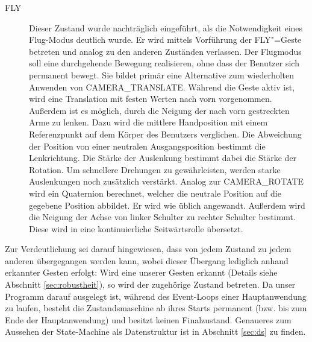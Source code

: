 \begin{description}
		\item[FLY] Dieser Zustand wurde nachträglich eingeführt, als die Notwendigkeit eines Flug-Modus deutlich wurde. Er wird mittels Vorführung der FLY"=Geste betreten und analog zu den anderen Zuständen verlassen. Der Flugmodus soll eine durchgehende Bewegung realisieren, ohne dass der Benutzer sich permanent bewegt. Sie bildet primär eine Alternative zum wiederholten Anwenden von CAMERA\_TRANSLATE. Während die Geste aktiv ist, wird eine Translation mit festen Werten nach vorn vorgenommen. Außerdem ist es möglich, durch die Neigung der nach vorn gestreckten Arme zu lenken. Dazu wird die mittlere Handposition mit einem Referenzpunkt auf dem Körper des Benutzers verglichen. Die Abweichung der Position von einer neutralen Ausgangsposition bestimmt die Lenkrichtung. Die Stärke der Auslenkung bestimmt dabei die Stärke der Rotation. Um schnellere Drehungen zu gewährleisten, werden starke Auslenkungen noch zusätzlich verstärkt. Analog zur CAMERA\_ROTATE wird ein Quaternion berechnet, welcher die neutrale Position auf die gegebene Position abbildet. Er wird wie üblich angewandt. Außerdem wird die Neigung der Achse von linker Schulter zu rechter Schulter bestimmt. Diese wird in eine kontinuierliche Seitwärtsrolle übersetzt.
	\end{description}
	Zur Verdeutlichung sei darauf hingewiesen, dass von jedem Zustand zu jedem anderen übergegangen werden kann, wobei dieser Übergang lediglich anhand erkannter Gesten erfolgt: Wird eine unserer Gesten erkannt (Details siehe Abschnitt \ref{sec:robustheit}), so wird der zugehörige Zustand betreten. Da unser Programm darauf ausgelegt ist, während des Event-Loops einer Hauptanwendung zu laufen, besteht die Zustandsmaschine ab ihres Starts permanent (bzw. bis zum Ende der Hauptanwendung) und besitzt keinen Finalzustand. Genaueres zum Aussehen der State-Machine als Datenstruktur ist in Abschnitt \ref{sec:ds} zu finden.

